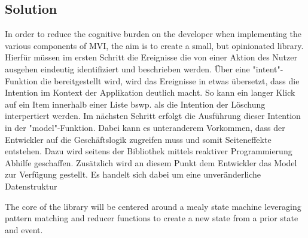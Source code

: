 \subsection{Solution}
\label{subsec:solution}


In order to reduce the cognitive burden on the developer when implementing the various components of MVI, the aim 
is to create a small, but opinionated library.
Hierfür müssen im ersten Schritt die Ereignisse die von einer Aktion des Nutzer ausgehen eindeutig identifiziert und beschrieben werden.
Über eine "intent"-Funktion die bereitgestellt wird, wird das Ereignisse in etwas übersetzt, dass die Intention im Kontext der Applikation
deutlich macht. So kann ein langer Klick auf ein Item innerhalb einer Liste bswp. als die Intention der Löschung interpertiert werden.
Im nächsten Schritt erfolgt die Ausführung dieser Intention in der "model"-Funktion. Dabei kann es unteranderem Vorkommen, dass der 
Entwickler auf die Geschäftslogik zugreifen muss und somit Seiteneffekte entstehen. Dazu wird seitens der Bibliothek mittels
reaktiver Programmierung Abhilfe geschaffen. Zusätzlich wird an diesem Punkt dem Entwickler das Model zur Verfügung gestellt.
Es handelt sich dabei um eine unveränderliche Datenstruktur



The core of the library will be centered around a mealy state machine leveraging pattern matching
and reducer functions to create a new state from a prior state and event.


